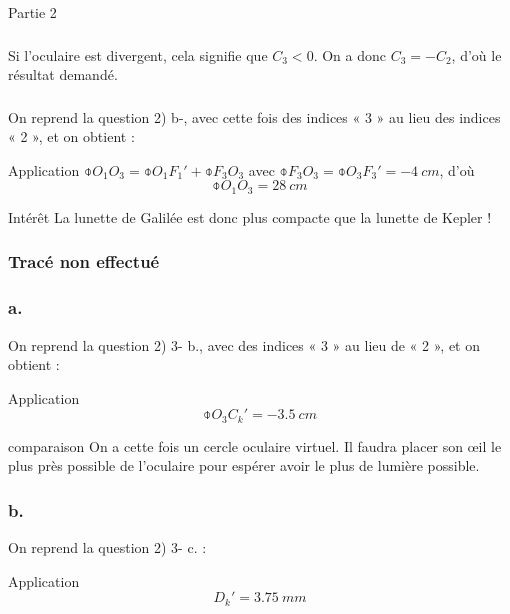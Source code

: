\documentclass[10pt,a5paper,notitlepage]{book}
\begin{document}
\begin{center}
    \huge Partie 2
\end{center}

\subsubsection{}
Si l'oculaire est divergent, cela signifie que $C_3 < 0$. On a donc $C_3 = -
C_2$, d'où le résultat demandé.

\subsubsection{}
On reprend la question 2) b-, avec cette fois des indices « 3 » au lieu des
indices « 2 », et on obtient :

\begin{lgtcb}{Application}
    $\obar{O_1O_3} = \obar{O_1F_1'} + \obar{F_3O_3}$ avec $\obar{F_3O_3} =
    \obar{O_3F_3'} = \SI{-4}{cm}$, d'où
    \[ \boxed{\obar{O_1O_3} = \SI{+28}{cm}} \]
\end{lgtcb}

\begin{inte}{Intérêt}
    La lunette de Galilée est donc plus compacte que la lunette de Kepler !
\end{inte}

\subsubsection{Tracé non effectué}

\subsubsection{a.}
On reprend la question 2) 3- b., avec des indices « 3 » au lieu de « 2 », et on
obtient :
\begin{lgtcb}{Application}
    \[ \boxed{\obar{O_3C_k'} = \SI{-3.5}{cm}}\]
\end{lgtcb}

\begin{rema}{comparaison}
    On a cette fois un cercle oculaire virtuel. Il faudra placer son œil le plus
    près possible de l'oculaire pour espérer avoir le plus de lumière possible.
\end{rema}

\setcounter{subsubsection}{6}
\subsubsection{b.}
On reprend la question 2) 3- c. :
\begin{lgtcb}{Application}
    \[ \boxed{D_k' = \SI{3.75}{mm}} \]
\end{lgtcb}
\end{document}
